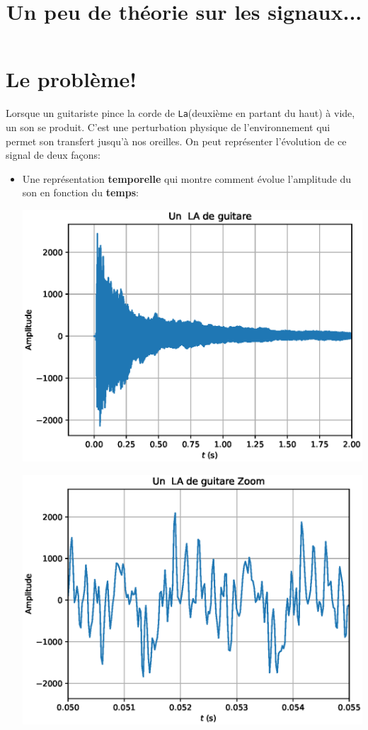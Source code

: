 \documentclass[11pt,a4paper]{article}
\title{\textbf{Un peu de théorie sur les signaux...}}
\date{}
\begin{document}
\maketitle
\tableofcontents
\newpage
\section{Le problème!}
Lorsque un guitariste pince la corde de \texttt{La}(deuxième en partant du haut) à vide, un son se produit. C'est une perturbation physique de l'environnement qui permet son transfert jusqu'à nos oreilles. On peut représenter l'évolution de ce signal de deux façons:
\begin{itemize}[label = ]
\item Une représentation \textbf{temporelle} qui montre comment évolue l'amplitude du son en fonction du \textbf{temps}:\\
\begin{minipage}{0.5\linewidth}
\includegraphics[scale=0.5]{la_guitare.eps} 

\end{minipage}
\begin{minipage}{0.5\linewidth}
\includegraphics[scale=0.5]{la_guitare_zoom.eps} 


\end{minipage}
\end{itemize}
\end{document}

